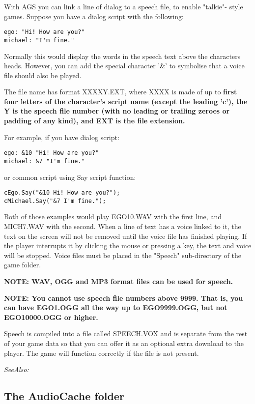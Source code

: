 With AGS you can link a line of dialog to a speech file, to enable "talkie"-
style games. Suppose you have a dialog script with the following:
\begin{verbatim}
ego: "Hi! How are you?"
michael: "I'm fine."
\end{verbatim}
Normally this would display the words in the speech text above the characters
heads. However, you can add the special character '&' to symbolise that a
voice file should also be played.

The file name has format XXXXY.EXT, where XXXX is made of up to \bf{first four
letters} of the character's script name (except the leading 'c'), the Y is the speech
file number (with no leading or trailing zeroes or padding of any kind), and EXT is the file extension.

For example, if you have dialog script:
\begin{verbatim}
ego: &10 "Hi! How are you?"
michael: &7 "I'm fine."
\end{verbatim}

or common script using Say script function:
\begin{verbatim}
cEgo.Say("&10 Hi! How are you?");
cMichael.Say("&7 I'm fine.");
\end{verbatim}

Both of those examples would play EGO10.WAV with the first line, and MICH7.WAV with the second.
When a line of text has a voice linked to it, the text on the screen will not
be removed until the voice file has finished playing. If the player interrupts
it by clicking the mouse or pressing a key, the text and voice will be stopped.
Voice files must be placed in the "Speech" sub-directory of the game folder.

\bf{NOTE:} WAV, OGG and MP3 format files can be used for speech.

\bf{NOTE:} You cannot use speech file numbers above 9999. That is, you can
have EGO1.OGG all the way up to EGO9999.OGG, but not EGO10000.OGG or higher.

Speech is compiled into a file called SPEECH.VOX and is separate
from the rest of your game data so that you can offer it as an optional extra
download to the player. The game will function correctly if the file is not
present.

\it{SeeAlso:} 


\subsection{The AudioCache folder}\label{AudioCache}%

